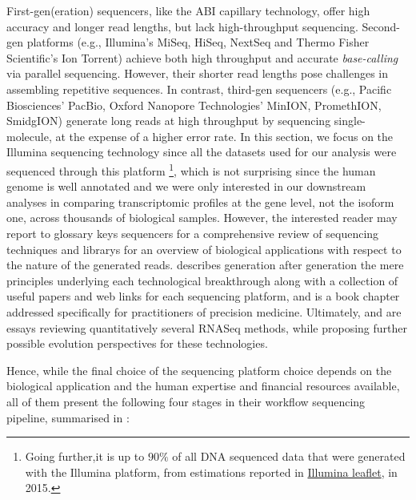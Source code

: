 First-gen(eration) \glspl{sequencer}, like the ABI capillary technology, offer high accuracy and longer read lengths, but lack high-throughput sequencing. Second-gen platforms (e.g., Illumina's MiSeq, HiSeq, NextSeq and Thermo Fisher Scientific's Ion Torrent) achieve both high throughput and accurate \emph{base-calling} via parallel sequencing. However, their shorter read lengths pose challenges in assembling repetitive sequences. In contrast, third-gen sequencers (e.g., Pacific Biosciences' PacBio, Oxford Nanopore Technologies' MinION, PromethION, SmidgION) generate long reads at high throughput by sequencing single-molecule, at the expense of a higher error rate. In this section, we focus on the Illumina sequencing technology since all the datasets used for our analysis were sequenced through this platform \footnote{Going further,it is up to $90\%$ of all DNA sequenced data that were generated with the Illumina platform, from estimations reported in \href{https://emea.illumina.com/techniques/sequencing/rna-sequencing/total-rna-seq.html}{Illumina leaflet}, in 2015.}, which is not surprising since the human genome is well annotated and we were only interested in our downstream analyses in comparing transcriptomic profiles at the gene level, not the isoform one, across thousands of biological samples. However, the interested reader may report to glossary keys \glspl{sequencer} for a comprehensive review of sequencing techniques and \glspl{library} for an overview of biological applications with respect to the nature of the generated reads. \autocite{slatko_etal18} describes generation after generation the mere principles underlying each technological breakthrough along with a collection of useful papers and web links for each sequencing platform, and \autocite{vilgis_deigner18} is a book chapter addressed specifically for practitioners of precision medicine. Ultimately, \autocite{lam_etal12} and \autocite{cottrell18} are essays reviewing quantitatively several RNASeq methods, while proposing further possible evolution perspectives for these technologies.


Hence, while the final choice of the sequencing platform choice depends on the biological application and the human expertise and financial resources available, all of them present the following four stages in their workflow sequencing pipeline, summarised in :

